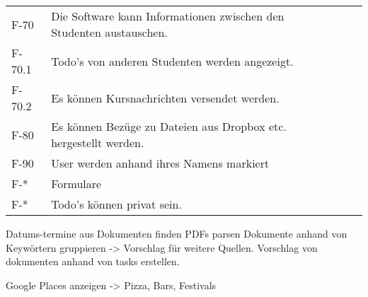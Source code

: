 \begin{table}[H]
\begin{longtable}{|l|l|l|l}
        F-70 & Die Software kann Informationen zwischen den Studenten austauschen. & & \\
        F-70.1 & Todo's von anderen Studenten werden angezeigt. & &\\
        F-70.2 & Es können Kursnachrichten versendet werden. & &\\
        F-80 & Es können Bezüge zu Dateien aus Dropbox etc. hergestellt werden. & &\\
        F-90 & User werden anhand ihres Namens markiert & &\\ %

        F-* & Formulare & &\\

        F-* & Todo's können privat sein. & & \\

        




        \hline
    \end{longtable}
\end{table}

Datums-termine aus Dokumenten finden
PDFs parsen
Dokumente anhand von Keywörtern gruppieren -> Vorschlag für weitere Quellen.
Vorschlag von dokumenten anhand von tasks erstellen.

Google Places anzeigen -> Pizza, Bars, Festivals

